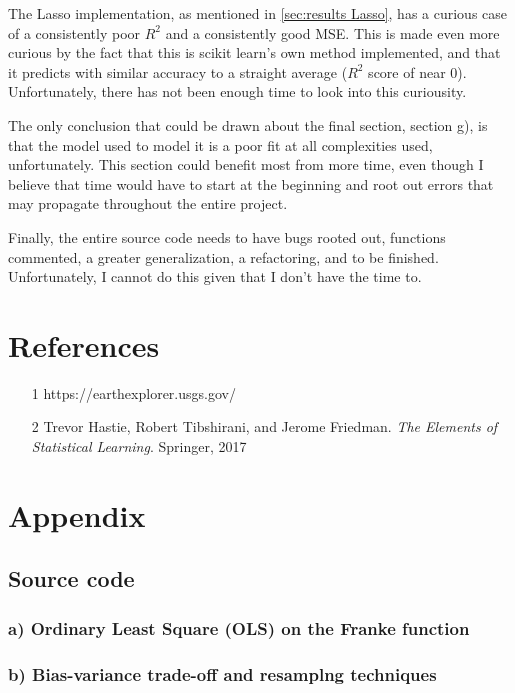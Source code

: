 \documentclass[a4paper, UKenglish]{article}
\newcommand{\0}{\mathbf{0}}
\newcommand{\1}{\mathbf{1}}
\begin{document}
The Lasso implementation, as mentioned in \autoref{sec:results Lasso}, has a curious case of a consistently poor $R^2$ and a consistently good MSE. This is made even more curious by the fact that this is scikit learn's own method implemented, and that it predicts with similar accuracy to a straight average ($R^2$ score of near 0). Unfortunately, there has not been enough time to look into this curiousity.

The only conclusion that could be drawn about the final section, section g), is that the model used to model it is a poor fit at all complexities used, unfortunately. This section could benefit most from more time, even though I believe that time would have to start at the beginning and root out errors that may propagate throughout the entire project.

Finally, the entire source code needs to have bugs rooted out, functions commented, a greater generalization, a refactoring, and to be finished. Unfortunately, I cannot do this given that I don't have the time to.


\section{References}
\begin{itemize}
\item [1] https://earthexplorer.usgs.gov/
\item [2] Trevor Hastie, Robert Tibshirani, and Jerome Friedman. \textit{The Elements of Statistical Learning}. Springer, 2017
\end{itemize}


\newpage
\section{Appendix}
\subsection{Source code}
\subsubsection{a) Ordinary Least Square (OLS) on the Franke function}

\newpage
\subsubsection{b) Bias-variance trade-off and resamplng techniques}

\newpage
\end{document}
